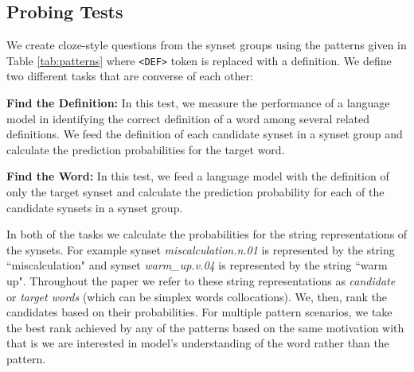 \documentclass[11pt,a4paper]{article}
\begin{document}
\subsection{Probing Tests}

We create cloze-style questions from the synset groups using the patterns given in Table \ref{tab:patterns} where \texttt{<DEF>} token is replaced with a definition. We define two different tasks that are converse of each other:

\vspace{0.3cm}

\noindent\textbf{Find the Definition:} In this test, we measure the performance of a language model in identifying the correct definition of a word among several related definitions. We feed the definition of each candidate synset in a synset group and calculate the prediction probabilities for the target word.

\vspace{0.3cm}

\noindent\textbf{Find the Word:} In this test, we feed a language model with the definition of only the target synset and calculate the prediction probability for each of the candidate synsets in a synset group.  

\vspace{0.3cm}

In both of the tasks we calculate the probabilities for the string representations of the synsets. For example synset \emph{miscalculation.n.01} is represented by the string ``miscalculation" and synset \emph{warm\_up.v.04} is represented by the string ``warm up". Throughout the paper we refer to these string representations as \textit{candidate} or \textit{target words} (which can be simplex words collocations). We, then, rank the candidates based on their probabilities. For multiple pattern scenarios, we take the best rank achieved by any of the patterns based on the same motivation with \cite{Schick20rareWords} that is we are interested in model's understanding of the word rather than the pattern. 

\end{document}
